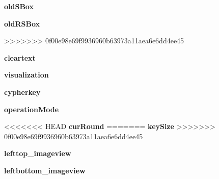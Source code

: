 \begin{DoxyCompactItemize}
\item 
\hypertarget{classsimplegui_1_1_main_scene_a12caf5854924dac329f3ee95d5c2f67f}{{\bfseries old\-S\-Box}}\label{classsimplegui_1_1_main_scene_a12caf5854924dac329f3ee95d5c2f67f}

\item 
\hypertarget{classsimplegui_1_1_main_scene_ab5c6e082bdf28d47e18c15115fb9d29a}{{\bfseries old\-R\-S\-Box}}\label{classsimplegui_1_1_main_scene_ab5c6e082bdf28d47e18c15115fb9d29a}
>>>>>>> 0f00e98e69f9936960b63973a11aea6e6dd4ee45

\item 
\hypertarget{classsimplegui_1_1_main_scene_ae295a66ef3135a9f1f445a82d8b4d647}{{\bfseries cleartext}}\label{classsimplegui_1_1_main_scene_ae295a66ef3135a9f1f445a82d8b4d647}

\item 
\hypertarget{classsimplegui_1_1_main_scene_a2522d257feb552ec87215e4af1055852}{{\bfseries visualization}}\label{classsimplegui_1_1_main_scene_a2522d257feb552ec87215e4af1055852}

\item 
\hypertarget{classsimplegui_1_1_main_scene_ab5d4615ae42d5c705ba4398b3e33fc7a}{{\bfseries cypherkey}}\label{classsimplegui_1_1_main_scene_ab5d4615ae42d5c705ba4398b3e33fc7a}

\item 
\hypertarget{classsimplegui_1_1_main_scene_aac7f93fc2da16c5425f60138e3b1ce51}{{\bfseries operation\-Mode}}\label{classsimplegui_1_1_main_scene_aac7f93fc2da16c5425f60138e3b1ce51}

\item 
<<<<<<< HEAD
\hypertarget{classsimplegui_1_1_main_scene_a1e40227d207ff4128178318f46b7eb64}{{\bfseries cur\-Round}}\label{classsimplegui_1_1_main_scene_a1e40227d207ff4128178318f46b7eb64}
=======
\hypertarget{classsimplegui_1_1_main_scene_a07365b93310d51583324117e96f548c7}{{\bfseries key\-Size}}\label{classsimplegui_1_1_main_scene_a07365b93310d51583324117e96f548c7}
>>>>>>> 0f00e98e69f9936960b63973a11aea6e6dd4ee45

\item 
\hypertarget{classsimplegui_1_1_main_scene_ac02d017c82930dc6d8ba7b50e08338f8}{{\bfseries lefttop\-\_\-imageview}}\label{classsimplegui_1_1_main_scene_ac02d017c82930dc6d8ba7b50e08338f8}

\item 
\hypertarget{classsimplegui_1_1_main_scene_abbaf5ce29ad761564b100bd0d67ad640}{{\bfseries leftbottom\-\_\-imageview}}\label{classsimplegui_1_1_main_scene_abbaf5ce29ad761564b100bd0d67ad640}


\end{DoxyCompactItemize}
